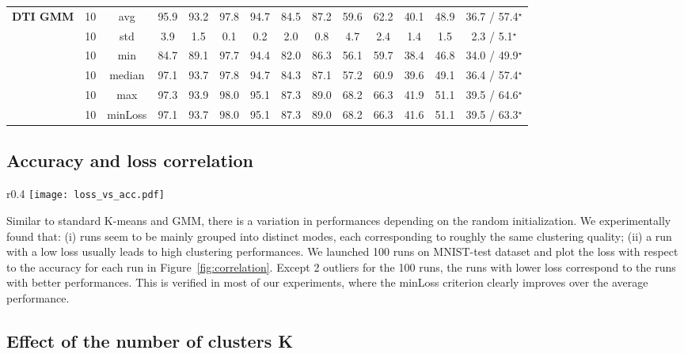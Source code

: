 \documentclass{article}
\begin{document}
\begin{table}[!hb]
\begin{tabular}{@{}lccccccccccccc@{}}
  \textbf{DTI GMM}
  & 10 & avg & 95.9 & 93.2 & 97.8 & 94.7 & 84.5 & 87.2 & 59.6 & 62.2 & 40.1 & 48.9 & 36.7 / 
  57.4$^{\star}$\\
  & 10 & std & 3.9 & 1.5 & 0.1 & 0.2 & 2.0 & 0.8 & 4.7 & 2.4 & 1.4 & 1.5 & 2.3 / 
  5.1$^{\star}$\\
  & 10 & min & 84.7 & 89.1 & 97.7 & 94.4 & 82.0 & 86.3 & 56.1 & 59.7 & 38.4 & 46.8 & 34.0 / 
  49.9$^{\star}$\\
  & 10 & median & 97.1 & 93.7 & 97.8 & 94.7 & 84.3 & 87.1 & 57.2 & 60.9 & 39.6 & 49.1 & 36.4 
  / 57.4$^{\star}$\\
  & 10 & max & 97.3 & 93.9 & 98.0 & 95.1 & 87.3 & 89.0 & 68.2 & 66.3 & 41.9 & 51.1 & 39.5 / 
  64.6$^{\star}$\\
  & 10 & minLoss & 97.1 & 93.7 & 98.0 & 95.1 & 87.3 & 89.0 & 68.2 & 66.3 & 41.6 & 51.1 & 39.5 
  / 63.3$^{\star}$\\
  \bottomrule
  \end{tabular}
  \label{tab:stats}
\end{table}

\subsection{Accuracy and loss correlation}\label{sec:correl}
\begin{wrapfigure}{r}{0.4\textwidth}
  \vspace{-1.3em}
  \centering
  \texttt{[image: loss\_vs\_acc.pdf]}
  \vspace{-1em}
  \caption{\textbf{Accuracy/loss correlation.} We report loss and accuracy for DTI K-means on 
  MNIST-test.}
  \label{fig:correlation}
  \vspace{-1em}
\end{wrapfigure}
Similar to standard K-means and GMM, there is a variation in performances depending on the 
random initialization. We experimentally found that: (i) runs seem to be mainly grouped into 
distinct modes, each corresponding to roughly the same clustering quality; (ii) a run with a 
low loss usually leads to high clustering performances.  We launched 100 runs on MNIST-test 
dataset and plot the loss with respect to the accuracy for each run in 
Figure~\ref{fig:correlation}. Except 2 outliers for the 100 runs, the runs with lower loss 
correspond to the runs with better performances. This is verified in most of our experiments, 
where the minLoss criterion clearly improves over the average performance.


\subsection{Effect of the number of clusters K}\label{sec:effect_k}
\end{document}
